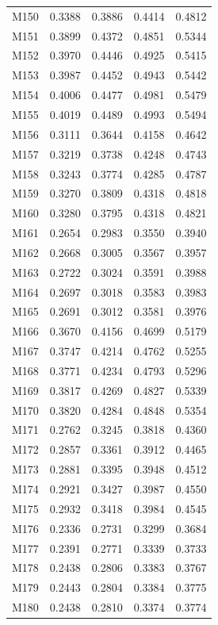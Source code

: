\begin{longtable}{lrrrr}
M150 & 0.3388 & 0.3886 & 0.4414 & 0.4812 \\
M151 & 0.3899 & 0.4372 & 0.4851 & 0.5344 \\
M152 & 0.3970 & 0.4446 & 0.4925 & 0.5415 \\
M153 & 0.3987 & 0.4452 & 0.4943 & 0.5442 \\
M154 & 0.4006 & 0.4477 & 0.4981 & 0.5479 \\
M155 & 0.4019 & 0.4489 & 0.4993 & 0.5494 \\
M156 & 0.3111 & 0.3644 & 0.4158 & 0.4642 \\
M157 & 0.3219 & 0.3738 & 0.4248 & 0.4743 \\
M158 & 0.3243 & 0.3774 & 0.4285 & 0.4787 \\
M159 & 0.3270 & 0.3809 & 0.4318 & 0.4818 \\
M160 & 0.3280 & 0.3795 & 0.4318 & 0.4821 \\
M161 & 0.2654 & 0.2983 & 0.3550 & 0.3940 \\
M162 & 0.2668 & 0.3005 & 0.3567 & 0.3957 \\
M163 & 0.2722 & 0.3024 & 0.3591 & 0.3988 \\
M164 & 0.2697 & 0.3018 & 0.3583 & 0.3983 \\
M165 & 0.2691 & 0.3012 & 0.3581 & 0.3976 \\
M166 & 0.3670 & 0.4156 & 0.4699 & 0.5179 \\
M167 & 0.3747 & 0.4214 & 0.4762 & 0.5255 \\
M168 & 0.3771 & 0.4234 & 0.4793 & 0.5296 \\
M169 & 0.3817 & 0.4269 & 0.4827 & 0.5339 \\
M170 & 0.3820 & 0.4284 & 0.4848 & 0.5354 \\
M171 & 0.2762 & 0.3245 & 0.3818 & 0.4360 \\
M172 & 0.2857 & 0.3361 & 0.3912 & 0.4465 \\
M173 & 0.2881 & 0.3395 & 0.3948 & 0.4512 \\
M174 & 0.2921 & 0.3427 & 0.3987 & 0.4550 \\
M175 & 0.2932 & 0.3418 & 0.3984 & 0.4545 \\
M176 & 0.2336 & 0.2731 & 0.3299 & 0.3684 \\
M177 & 0.2391 & 0.2771 & 0.3339 & 0.3733 \\
M178 & 0.2438 & 0.2806 & 0.3383 & 0.3767 \\
M179 & 0.2443 & 0.2804 & 0.3384 & 0.3775 \\
M180 & 0.2438 & 0.2810 & 0.3374 & 0.3774 \\

\end{longtable}
